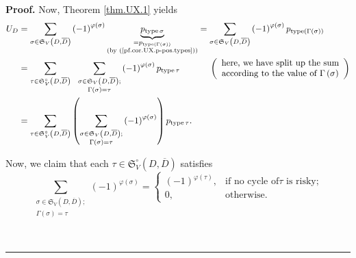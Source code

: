 \documentclass[numbers=enddot,12pt,final,onecolumn,notitlepage]{scrartcl}%
\numberwithin{exer}{section}
\theoremstyle{definition}
\newenvironment{proof}[1][Proof]{\noindent\textbf{#1.} }{\ \rule{0.5em}{0.5em}}
\let\sumnonlimits\sum
\renewcommand{\sum}{\sumnonlimits\limits}
\begin{document}
\begin{proof}
Now, Theorem \ref{thm.UX.1} yields%
\begin{align}
U_{D}  &  =\sum_{\sigma\in\mathfrak{S}_{V}\left(  D,\overline{D}\right)
}\left(  -1\right)  ^{\varphi\left(  \sigma\right)  }%
\underbrace{p_{\operatorname*{type}\sigma}}%
_{\substack{=p_{\operatorname*{type}\left(  \Gamma\left(  \sigma\right)
\right)  }\\\text{(by (\ref{pf.cor.UX.p-pos.types}))}}}=\sum_{\sigma
\in\mathfrak{S}_{V}\left(  D,\overline{D}\right)  }\left(  -1\right)
^{\varphi\left(  \sigma\right)  }p_{\operatorname*{type}\left(  \Gamma\left(
\sigma\right)  \right)  }\nonumber\\
&  =\sum_{\tau\in\mathfrak{S}_{V}^{\circ}\left(  D,\overline{D}\right)
}\ \ \sum_{\substack{\sigma\in\mathfrak{S}_{V}\left(  D,\overline{D}\right)
;\\\Gamma\left(  \sigma\right)  =\tau}}\left(  -1\right)  ^{\varphi\left(
\sigma\right)  }p_{\operatorname*{type}\tau}\ \ \ \ \ \ \ \ \ \ \left(
\begin{array}
[c]{c}%
\text{here, we have split up the sum}\\
\text{according to the value of }\Gamma\left(  \sigma\right)
\end{array}
\right) \nonumber\\
&  =\sum_{\tau\in\mathfrak{S}_{V}^{\circ}\left(  D,\overline{D}\right)
}\left(  \sum_{\substack{\sigma\in\mathfrak{S}_{V}\left(  D,\overline
{D}\right)  ;\\\Gamma\left(  \sigma\right)  =\tau}}\left(  -1\right)
^{\varphi\left(  \sigma\right)  }\right)  p_{\operatorname*{type}\tau}.
\label{pf.cor.UX.p-pos.2}%
\end{align}


Now, we claim that each $\tau\in\mathfrak{S}_{V}^{\circ}\left(  D,\overline
{D}\right)  $ satisfies%
\begin{equation}
\sum_{\substack{\sigma\in\mathfrak{S}_{V}\left(  D,\overline{D}\right)
;\\\Gamma\left(  \sigma\right)  =\tau}}\left(  -1\right)  ^{\varphi\left(
\sigma\right)  }=%
\begin{cases}
\left(  -1\right)  ^{\varphi\left(  \tau\right)  }, & \text{if no cycle of
}\tau\text{ is risky};\\
0, & \text{otherwise.}%
\end{cases}
\label{pf.cor.UX.p-pos.cancel}%
\end{equation}



\end{proof}
\end{document}
